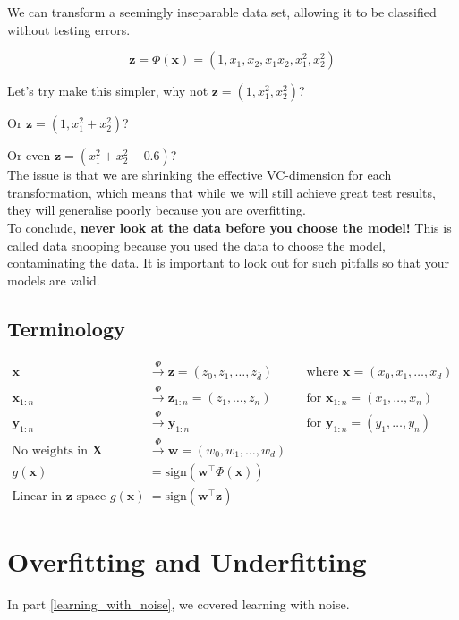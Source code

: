 We can transform a seemingly inseparable data set, allowing it to be classified without testing errors.

\[
    \mathbf{z} = \Phi(\mathbf{x}) = (1, x_1, x_2, x_1x_2, x_1^2, x_2^2)
\]

Let's try make this simpler, why not 
$\mathbf{z} = (1, x^2_1, x^2_2)$? 

Or $\mathbf{z} = (1, x^2_1+x^2_2)$? 

Or even 
$\mathbf{z} = (x^2_1+x^2_2-0.6)$?\\

The issue is that we are shrinking the effective VC-dimension for each transformation, which means that while we will still achieve great test results, they will generalise poorly because you are overfitting.\\

To conclude, \textbf{never look at the data before you choose the model!} This is called data snooping because you used the data to choose the model, contaminating the data. It is important to look out for such pitfalls so that your models are valid.

\subsection{Terminology}

\begin{align*}
\mathbf{x} & \xrightarrow{\Phi} \mathbf{z} = (z_0, z_1, \ldots, z_{\bar{d}}) && \text{where } \mathbf{x} = (x_0, x_1, \ldots, x_d) \\
\mathbf{x}_{1:n} & \xrightarrow{\Phi} \mathbf{z}_{1:n} = (z_1, \ldots, z_n) && \text{for } \mathbf{x}_{1:n} = (x_1, \ldots, x_n) \\
\mathbf{y}_{1:n} & \xrightarrow{\Phi} \mathbf{y}_{1:n} && \text{for } \mathbf{y}_{1:n} = (y_1, \ldots, y_n) \\
\text{No weights in } \mathbf{X} & \xrightarrow{\Phi} \mathbf{w} = (w_0, w_1, \ldots, w_d) \\
g(\mathbf{x}) & = \text{sign}(\mathbf{w}^\top \Phi(\mathbf{x})) \\
\text{Linear in } \mathbf{z} \text{ space } g(\mathbf{x}) & = \text{sign}(\mathbf{w}^\top \mathbf{z})
\end{align*}







\section{Overfitting and Underfitting}
In part \ref{learning_with_noise}, we covered learning with noise.

